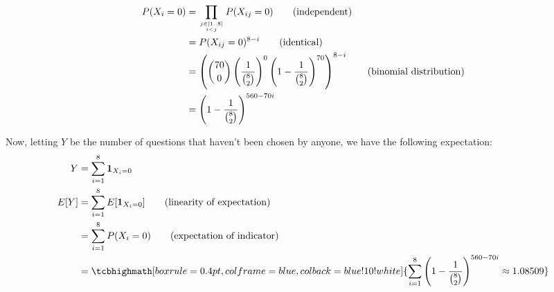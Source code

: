 \documentclass{article}
\begin{document}
\begin{align*}
    P(X_i=0)&=\prod_{j\in[1..8]\atop{i<j}}P(X_{ij}=0)\tag{independent}\\
    &=P(X_{ij}=0)^{8-i}\tag{identical}\\
    &=\left(\binom{70}{0}\left(\frac{1}{\binom{8}{2}}\right)^0\left(1-\frac{1}{\binom{8}{2}}\right)^{70}\right)^{8-i}\tag{binomial distribution}\\
    &=\left(1-\frac{1}{\binom{8}{2}}\right)^{560-70i}
\end{align*}

Now, letting $Y$ be the number of questions that haven't been chosen by anyone, we have the following expectation:
\begin{align*}
    Y&=\sum_{i=1}^8 \mathbf{1}_{X_i=0}\\
    E[Y]&=\sum_{i=1}^8 E[\mathbf{1}_{X_i=0}]\tag{linearity of expectation}\\
    &=\sum_{i=1}^8 P(X_i=0)\tag{expectation of indicator}\\
    &=\tcbhighmath[boxrule=0.4pt,colframe=blue,colback=blue!10!white]{\sum_{i=1}^8 \left(1-\frac{1}{\binom{8}{2}}\right)^{560-70i}\approx1.08509}
\end{align*}
\end{document}

